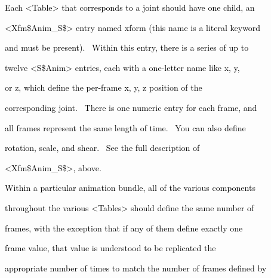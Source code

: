 \documentclass[a4paper]{article}
\newcommand\textstyleOOoComputerKeyWord[1]{\textrm{\textcolor[rgb]{0.0,0.0,0.5019608}{#1}}}
\begin{document}
\bigskip

{\color{black}
\textstyleOOoComputerKeyWord{\textcolor{black}{\ \ Each {\textless}Table{\textgreater} that corresponds to a joint
should have one child, an}}}

{\color{black}
\textstyleOOoComputerKeyWord{\textcolor{black}{\ \ {\textless}Xfm\$Anim\_S\${\textgreater} entry named
{\textquotedbl}xform{\textquotedbl} (this name is a literal keyword}}}

{\color{black}
\textstyleOOoComputerKeyWord{\textcolor{black}{\ \ and must be present). \ Within this entry, there is a series of up
to}}}

{\color{black}
\textstyleOOoComputerKeyWord{\textcolor{black}{\ \ twelve {\textless}S\$Anim{\textgreater} entries, each with a
one-letter name like {\textquotedbl}x{\textquotedbl}, {\textquotedbl}y{\textquotedbl},}}}

{\color{black}
\textstyleOOoComputerKeyWord{\textcolor{black}{\ \ or {\textquotedbl}z{\textquotedbl}, which define the per-frame x, y,
z position of the}}}

{\color{black}
\textstyleOOoComputerKeyWord{\textcolor{black}{\ \ corresponding joint. \ There is one numeric entry for each frame,
and}}}

{\color{black}
\textstyleOOoComputerKeyWord{\textcolor{black}{\ \ all frames represent the same length of time. \ You can also
define}}}

{\color{black}
\textstyleOOoComputerKeyWord{\textcolor{black}{\ \ rotation, scale, and shear. \ See the full description of}}}

{\color{black}
\textstyleOOoComputerKeyWord{\textcolor{black}{\ \ {\textless}Xfm\$Anim\_S\${\textgreater}, above.}}}


\bigskip

{\color{black}
\textstyleOOoComputerKeyWord{\textcolor{black}{\ \ Within a particular animation bundle, all of the various
components}}}

{\color{black}
\textstyleOOoComputerKeyWord{\textcolor{black}{\ \ throughout the various {\textless}Tables{\textgreater} should define
the same number of}}}

{\color{black}
\textstyleOOoComputerKeyWord{\textcolor{black}{\ \ frames, with the exception that if any of them define exactly one}}}

{\color{black}
\textstyleOOoComputerKeyWord{\textcolor{black}{\ \ frame value, that value is understood to be replicated the}}}

{\color{black}
\textstyleOOoComputerKeyWord{\textcolor{black}{\ \ appropriate number of times to match the number of frames defined
by}}}
\end{document}
